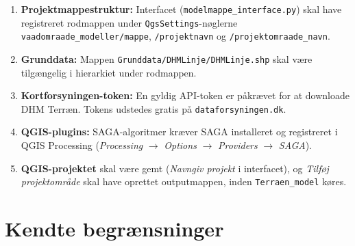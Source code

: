 \begin{enumerate}
  \item \textbf{Projektmappestruktur:} Interfacet (\texttt{modelmappe\_interface.py})
        skal have registreret rodmappen under \texttt{QgsSettings}-nøglerne
        \texttt{vaadomraade\_modeller/mappe}, \texttt{/projektnavn} og
        \texttt{/projektomraade\_navn}.

  \item \textbf{Grunddata:} Mappen \texttt{Grunddata/DHMLinje/DHMLinje.shp}
        skal være tilgængelig i hierarkiet under rodmappen.

  \item \textbf{Kortforsyningen-token:} En gyldig API-token er påkrævet for
        at downloade DHM Terræn. Tokens udstedes gratis på
        \texttt{dataforsyningen.dk}.

  \item \textbf{QGIS-plugins:} SAGA-algoritmer kræver SAGA installeret og
        registreret i QGIS Processing
        (\textit{Processing} $\to$ \textit{Options} $\to$ \textit{Providers}
        $\to$ \textit{SAGA}).

  \item \textbf{QGIS-projektet} skal være gemt (\textit{Navngiv projekt} i
        interfacet), og \textit{Tilføj projektområde} skal have oprettet
        outputmappen, inden \texttt{Terraen\_model} køres.
\end{enumerate}


\section{Kendte begrænsninger}
\label{sec:begr}

